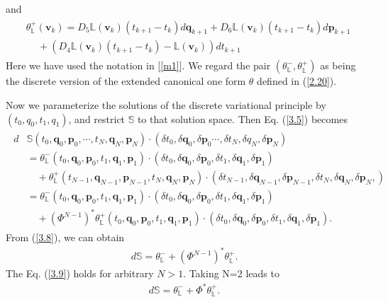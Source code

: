 \documentclass[a4paper,a4paper]{article}
\def\q{\boldsymbol{q}}
\def\p{\boldsymbol{p}}
\def\w{\boldsymbol{v}}
\begin{document}
and
\begin{align}
\begin{split}
 &\theta_{\mathbb{L}}^{+}(\w_{k})
           =D_{5}\mathbb{L}(\w_{k})(t_{k+1}-t_{k}) d\q_{k+1}
             +D_{6}\mathbb{L}(\w_{k})(t_{k+1}-t_{k}) d\p_{k+1}\\
      &\, \quad +(D_{4}\mathbb{L}(\w_{k})(t_{k+1}-t_{k})
            -\mathbb{L}(\w_{k}))dt_{k+1} \label{3.7}
\end{split}
\end{align}
Here we have used the notation in [\ref{m1}]. We regard the pair $(\theta_{\mathbb{L}}^{-},
\theta_{\mathbb{L}}^{+})$ as being the discrete version of the extended canonical
one form $\theta$ defined in (\ref{2.20}).

Now we parameterize the solutions of the discrete variational principle by
$(t_{0}, q_{0}, t_{1}, q_{1})$, and  restrict $\mathbb{S}$ to that solution
space.  Then Eq. (\ref{3.5}) becomes
\begin{align}
\begin{split}
 d&\mathbb{S}(t_{0}, \q_{0}, \p_{0}, \cdots, t_{N}, \q_{N}, \p_{N})\cdot
               (\delta t_{0}, \delta \q_{0}, \delta \p_{0}\cdots, \delta t_{N},
               \delta q_{N}, \delta \p_{N})\\
 &=\theta_{\mathbb{L}}^{-}(t_{0}, \q_{0}, \p_{0}, t_{1}, \q_{1}, \p_{1})\cdot
                 (\delta t_{0}, \delta \q_{0},  \delta \p_{0}, \delta t_{1},
                 \delta \q_{1}, \delta \p_{1})\\
 &\quad +\theta_{\mathbb{L}}^{+}(t_{N-1}, \q_{N-1}, \p_{N-1},
         t_{N}, \q_{N}, \p_{N})\cdot
         (\delta t_{N-1}, \delta \q_{N-1},  \delta \p_{N-1}, \delta t_{N},
         \delta \q_{N}, \delta \p_{N},)\\
 &=\theta_{\mathbb{L}}^{-}(t_{0}, \q_{0}, \p_{0}, t_{1}, \q_{1}, \p_{1})\cdot
    (\delta t_{0}, \delta \q_{0},  \delta \p_{0}, \delta t_{1},
                 \delta \q_{1}, \delta \p_{1})\\
   &\quad +(\Phi^{N-1})^{*}\theta_{\mathbb{L}}^{+}(t_{0}, \q_{0}, \p_{0}, t_{1},
              \q_{1}, \p_{1})\cdot
    (\delta t_{0}, \delta \q_{0},  \delta \p_{0}, \delta t_{1},
                 \delta \q_{1}, \delta \p_{1}). \label{3.8}
\end{split}
\end{align}
From (\ref{3.8}), we can obtain
\begin{align}
d\mathbb{S}=\theta_{\mathbb{L}}^{-}+(\Phi^{N-1})^{*}\theta_{\mathbb{L}}^{+}.
\label{3.9}
\end{align}
The Eq. (\ref{3.9}) holds for arbitrary $N>1$. Taking N=2 leads to
\begin{align}
d\mathbb{S}=\theta_{\mathbb{L}}^{-}+\Phi^{*}\theta_{\mathbb{L}}^{+}.
\label{3.10}
\end{align}
\end{document}
